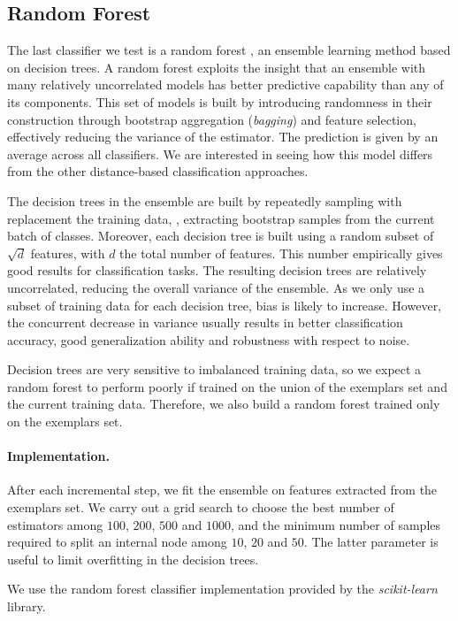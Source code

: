 \documentclass[10pt,twocolumn,letterpaper]{article}
\begin{document}
\subsection{Random Forest}
The last classifier we test is a random forest \cite{breiman:2001}, an ensemble learning method based on decision trees. A random forest exploits the insight that an ensemble with many relatively uncorrelated models has better predictive capability than any of its components. This set of models is built by introducing randomness in their construction through bootstrap aggregation (\emph{bagging}) and feature selection, effectively reducing the variance of the estimator. The prediction is given by an average across all classifiers. We are interested in seeing how this model differs from the other distance-based classification approaches.

The decision trees in the ensemble are built by repeatedly sampling with replacement the training data, \ie, extracting bootstrap samples from the current batch of classes. Moreover, each decision tree is built using a random subset of $\sqrt{d}$ features, with $d$ the total number of features. This number empirically gives good results for classification tasks. The resulting decision trees are relatively uncorrelated, reducing the overall variance of the ensemble. As we only use a subset of training data for each decision tree, bias is likely to increase. However, the concurrent decrease in variance usually results in better classification accuracy, good generalization ability and robustness with respect to noise.

Decision trees are very sensitive to imbalanced training data, so we expect a random forest to perform poorly if trained on the union of the exemplars set and the current training data. Therefore, we also build a random forest trained only on the exemplars set.

\paragraph{Implementation.}
After each incremental step, we fit the ensemble on features extracted from the exemplars set. We carry out a grid search to choose the best number of estimators among $100$, $200$, $500$ and $1000$, and the minimum number of samples required to split an internal node among $10$, $20$ and $50$. The latter parameter is useful to limit overfitting in the decision trees.

We use the random forest classifier implementation provided by the \emph{scikit-learn} library.
\end{document}
